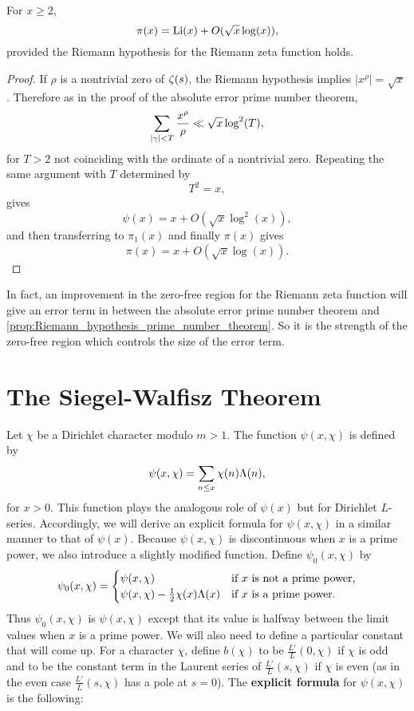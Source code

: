     \begin{proposition}\label{prop:Riemann_hypothesis_prime_number_theorem}
      For $x \ge 2$,
      \[
        \pi(x) = \operatorname{\mathrm{Li}}(x)+O(\sqrt{x}\log(x)),
      \]
      provided the Riemann hypothesis for the Riemann zeta function holds.
    \end{proposition}
    \begin{proof}
      If $\rho$ is a nontrivial zero of $\zeta(s)$, the Riemann hypothesis implies $|x^{\rho}| = \sqrt{x}$. Therefore as in the proof of the absolute error prime number theorem,
      \[
        \sum_{|\gamma| < T}\frac{x^{\rho}}{\rho} \ll \sqrt{x}\log^{2}(T),
      \]
      for $T > 2$ not coinciding with the ordinate of a nontrivial zero. Repeating the same argument with $T$ determined by
      \[
        T^{2} = x,
      \]
      gives
      \[
        \psi(x) = x+O(\sqrt{x}\log^{2}(x)),
      \]
      and then transferring to $\pi_{1}(x)$ and finally $\pi(x)$ gives
      \[
        \pi(x) = x+O(\sqrt{x}\log(x)).
      \]
    \end{proof}

    In fact, an improvement in the zero-free region for the Riemann zeta function will give an error term in between the absolute error prime number theorem and \cref{prop:Riemann_hypothesis_prime_number_theorem}. So it is the strength of the zero-free region which controls the size of the error term.
  \section{The Siegel-Walfisz Theorem}
    Let $\chi$ be a Dirichlet character modulo $m > 1$. The function $\psi(x,\chi)$ is defined by
    \[
      \psi(x,\chi) = \sum_{n \le x}\chi(n)\Lambda(n),
    \]
    for $x > 0$. This function plays the analogous role of $\psi(x)$ but for Dirichlet $L$-series. Accordingly, we will derive an explicit formula for $\psi(x,\chi)$ in a similar manner to that of $\psi(x)$. Because $\psi(x,\chi)$ is discontinuous when $x$ is a prime power, we also introduce a slightly modified function. Define $\psi_{0}(x,\chi)$ by
    \[
      \psi_{0}(x,\chi) = \begin{cases} \psi(x,\chi) & \text{if $x$ is not a prime power}, \\ \psi(x,\chi)-\frac{1}{2}\chi(x)\Lambda(x) & \text{if $x$ is a prime power}. \end{cases}
    \]
    Thus $\psi_{0}(x,\chi)$ is $\psi(x,\chi)$ except that its value is halfway between the limit values when $x$ is a prime power. We will also need to define a particular constant that will come up. For a character $\chi$, define $b(\chi)$ to be $\frac{L'}{L}(0,\chi)$ if $\chi$ is odd and to be the constant term in the Laurent series of $\frac{L'}{L}(s,\chi)$ if $\chi$ is even (as in the even case $\frac{L'}{L}(s,\chi)$ has a pole at $s = 0$). The \textbf{explicit formula} for $\psi(x,\chi)$ is the following:

